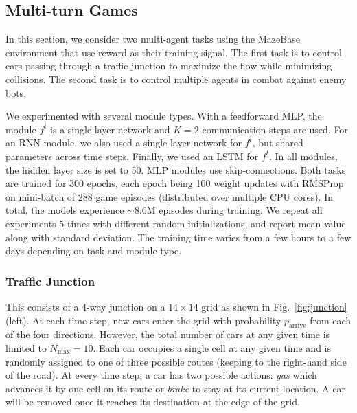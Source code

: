 \documentclass{article}
\newcommand{\fig}[1]{Fig.~\ref{fig:#1}}
\begin{document}
\subsection{Multi-turn Games}
\vspace{-2mm}
In this section, we consider two multi-agent tasks using the MazeBase
environment \cite{Mazebase} that use reward as their training
signal. The first task is to control cars passing through a traffic
junction to maximize the flow while minimizing collisions. The second task
is to control multiple agents in combat against enemy bots. 

We experimented with several module types. With a feedforward MLP, the
module $f^i$ is a single layer network and $K=2$ communication steps
are used. For an RNN module, we also used a single layer network for
$f^t$, but shared parameters across time steps. Finally, we used
an LSTM for $f^t$. In all modules, the hidden layer size is set to
50. MLP modules use skip-connections. Both tasks are trained for
300 epochs, each epoch being 100 weight updates with
RMSProp~\cite{Tieleman2012} on mini-batch of 288 game episodes
(distributed over multiple CPU cores). In total, the models experience
$\sim$8.6M episodes during training.  We repeat all experiments 5
times with different random initializations, and report mean value
along with standard deviation. The training time varies from a few hours
to a few days depending on task and module type.

\subsubsection{Traffic Junction}
\vspace{-2mm}
This consists of a 4-way junction on a $14\times14$
grid as shown in \fig{junction}(left). At each time step, new cars
enter the grid with
probability $p_\text{arrive}$ from each of the four
directions. However, the total number of cars at
any given time is limited to $N_\text{max}=10$. Each car occupies a
single cell at any given time and is randomly assigned to one of three
possible routes (keeping to the right-hand side of the
road). At every time step, a car has two possible
actions: \emph{gas} which advances it by one cell on its
route or \emph{brake} to stay at its current location. A car
will be removed once it reaches its destination at the edge of the grid.
\end{document}
